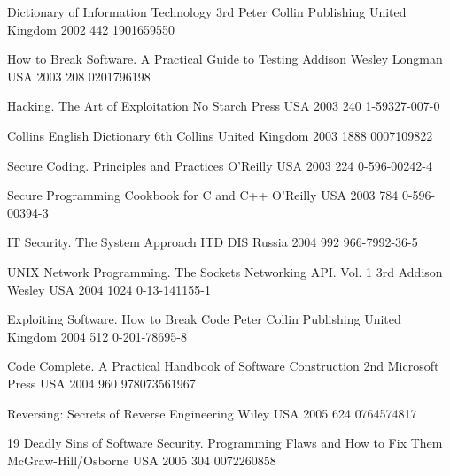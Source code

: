 \begin{thebibliography}{9}
		{} %
		{Dictionary of {I}nformation {T}echnology}
		{3rd}
		{Peter Collin Publishing}
		{United Kingdom}
		{2002}
		{442}
		{1901659550}
		
		{}
		{How to Break Software. A Practical Guide to Testing}
		{}
		{Addison Wesley Longman}
		{USA}
		{2003}
		{208}
		{0201796198}
	
		{}
		{Hacking. The Art of Exploitation}
		{}
		{No Starch Press}
		{USA}
		{2003}
		{240}
		{1-59327-007-0}
	
		{}
		{Collins {E}nglish {D}ictionary}
		{6th}
		{Collins}
		{United Kingdom}
		{2003}
		{1888}
		{0007109822}
	
		{
			\BibAnd
			}
		{Secure Coding. Principles and Practices}
		{}
		{O'Reilly}
		{USA}
		{2003}
		{224}
		{0-596-00242-4}
	
		{
			\BibAnd
			}
		{Secure Programming Cookbook for {C} and {C++}}
		{}
		{O'Reilly}
		{USA}
		{2003}
		{784}
		{0-596-00394-3}
	
		{}
		{{IT} Security. The System Approach}
		{}
		{ITD DIS}
		{Russia}
		{2004}
		{992}
		{966-7992-36-5}
	
		{
			\BibAnd
			\BibAnd
			}
		{{UNIX} Network Programming. The Sockets Networking {API}. Vol. 1}
		{3rd}
		{Addison Wesley}
		{USA}
		{2004}
		{1024}
		{0-13-141155-1}
	
		{
			\BibAnd
			}
		{Exploiting Software. How to Break Code}
		{}
		{Peter Collin Publishing}
		{United Kingdom}
		{2004}
		{512}
		{0-201-78695-8}
	
		{}
		{Code Complete. A Practical Handbook of Software Construction}
		{2nd}
		{Microsoft Press}
		{USA}
		{2004}
		{960}
		{978073561967}
	
		{}
		{Reversing: Secrets of Reverse Engineering}
		{}
		{Wiley}
		{USA}
		{2005}
		{624}
		{0764574817}
	
		{
			\BibAnd
			\BibAnd
			}
		{19 Deadly Sins of Software Security. Programming Flaws and How to Fix Them}
		{}
		{McGraw-Hill/Osborne}
		{USA}
		{2005}
		{304}
		{0072260858}
	

\end{thebibliography}
